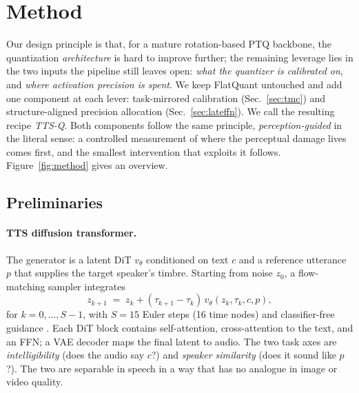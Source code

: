 \section{Method}
Our design principle is that, for a mature rotation-based PTQ backbone, the quantization \emph{architecture} is hard to improve further; the remaining leverage lies in the two inputs the pipeline still leaves open: \emph{what the quantizer is calibrated on}, and \emph{where activation precision is spent}. We keep FlatQuant untouched and add one component at each lever: task-mirrored calibration (Sec.~\ref{sec:tmc}) and structure-aligned precision allocation (Sec.~\ref{sec:lateffn}). We call the resulting recipe \emph{TTS-Q}. Both components follow the same principle, \emph{perception-guided} in the literal sense: a controlled measurement of where the perceptual damage lives comes first, and the smallest intervention that exploits it follows. Figure~\ref{fig:method} gives an overview.



\subsection{Preliminaries}
\label{sec:prelim}

\paragraph{TTS diffusion transformer.}
The generator is a latent DiT $v_\theta$ conditioned on text $c$ and a reference utterance $p$ that supplies the target speaker's timbre. Starting from noise $z_{0}$, a flow-matching sampler \citep{lipman2023flow} integrates
\begin{equation}
z_{k+1} \;=\; z_{k} + (\tau_{k+1}-\tau_{k})\, v_\theta\!\left(z_{k},\tau_{k},c,p\right),
\label{eq:ode}
\end{equation}
for $k=0,\dots,S{-}1$, with $S{=}15$ Euler steps (16 time nodes) and classifier-free guidance \citep{ho2022cfg}. Each DiT block contains self-attention, cross-attention to the text, and an FFN; a VAE decoder maps the final latent to audio. The two task axes are \emph{intelligibility} (does the audio say $c$?) and \emph{speaker similarity} (does it sound like $p$?). The two are separable in speech in a way that has no analogue in image or video quality.

